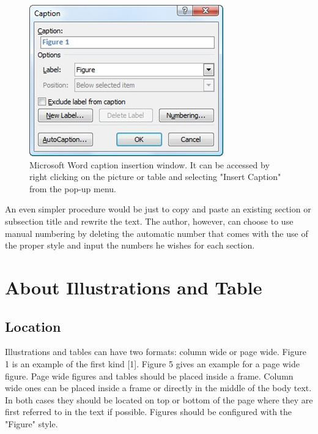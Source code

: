 \documentclass[10pt]{imeko_acta}
\begin{document}
\begin{figure}[!tb]
	\centering
	\includegraphics[width=.9\columnwidth]{image3}
	\caption{Microsoft Word caption insertion window. It can be accessed by right clicking on the picture or table and selecting "Insert Caption" from the pop-up menu.}
	\label{fig:image3}
\end{figure}

An even simpler procedure would be just to copy and paste an existing section or subsection title and rewrite the text. The author, however, can choose to use manual numbering by deleting the automatic number that comes with the use of the proper style and input the numbers he wishes for each section.



\section{About Illustrations and Table}

\subsection{Location}

Illustrations and tables can have two formats: column wide or page wide. Figure 1 is an example of the first kind [1]. Figure 5 gives an example for a page wide figure.
Page wide figures and tables should be placed inside a frame. Column wide ones can be placed inside a frame or directly in the middle of the body text. In both cases they should be located on top or bottom of the page where they are first referred to in the text if possible. Figures should be configured with the "Figure" style.
\end{document}
